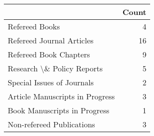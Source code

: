 \begin{tabular}{lr}
\toprule
 & Count \\
\midrule
Refereed Books & 4 \\
Refereed Journal Articles & 16 \\
Refereed Book Chapters & 9 \\
Research \textbackslash \& Policy Reports & 5 \\
Special Issues of Journals & 2 \\
Article Manuscripts in Progress & 3 \\
Book Manuscripts in Progress & 1 \\
Non-refereed Publications & 3 \\
\bottomrule
\end{tabular}

